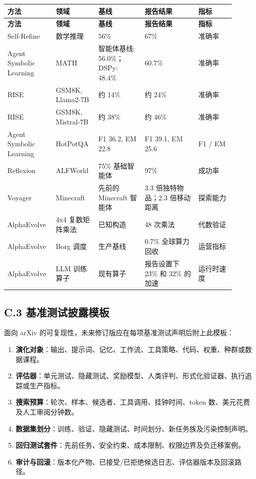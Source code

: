 {\TableTight
\begin{longtable}{@{}L{0.18\linewidth}L{0.17\linewidth}L{0.19\linewidth}L{0.22\linewidth}L{0.15\linewidth}@{}}
\toprule
\textbf{方法} & \textbf{领域} & \textbf{基线} & \textbf{报告结果} & \textbf{指标} \\
\midrule
\endfirsthead
\toprule
\textbf{方法} & \textbf{领域} & \textbf{基线} & \textbf{报告结果} & \textbf{指标} \\
\midrule
\endhead
\bottomrule
\endlastfoot
Self-Refine & 数学推理 & 56\% & 67\% & 准确率 \\
Agent Symbolic Learning & MATH & 智能体基线: 56.0\%；DSPy: 48.4\% & 60.7\% & 准确率 \\
RISE & GSM8K, Llama2-7B & 约 14\% & 约 24\% & 准确率 \\
RISE & GSM8K, Mistral-7B & 约 38\% & 约 46\% & 准确率 \\
Agent Symbolic Learning & HotPotQA & F1 36.2, EM 22.8 & F1 39.1, EM 25.6 & F1 / EM \\
Reflexion & ALFWorld & 75\% 基础智能体 & 97\% & 成功率 \\
Voyager & Minecraft & 先前的 Minecraft 智能体 & 3.3 倍独特物品；2.3 倍移动距离 & 探索能力 \\
AlphaEvolve & 4x4 复数矩阵乘法 & 已知构造 & 48 次乘法 & 代数验证 \\
AlphaEvolve & Borg 调度 & 生产基线 & 0.7\% 全球算力回收 & 运营指标 \\
AlphaEvolve & LLM 训练算子 & 现有算子 & 报告设置下 23\% 和 32\% 的加速 & 运行时速度 \\
\end{longtable}}

\subsection*{C.3 基准测试披露模板}

面向 arXiv 的可复现性，未来修订版应在每项基准测试声明后附上此模板：

\begin{enumerate}
\item \textbf{演化对象}：输出、提示词、记忆、工作流、工具策略、代码、权重、种群或数据课程。
\item \textbf{评估器}：单元测试、隐藏测试、奖励模型、人类评判、形式化验证器、执行追踪或生产指标。
\item \textbf{搜索预算}：轮次、样本、候选者、工具调用、挂钟时间、token 数、美元花费及人工审阅分钟数。
\item \textbf{数据集划分}：训练、验证、隐藏测试、时间划分、新任务族及污染控制声明。
\item \textbf{回归测试套件}：先前任务、安全约束、成本限制、权限边界及负迁移案例。
\item \textbf{审计与回滚}：版本化产物、已接受/已拒绝候选日志、评估器版本及回滚路径。
\end{enumerate}


